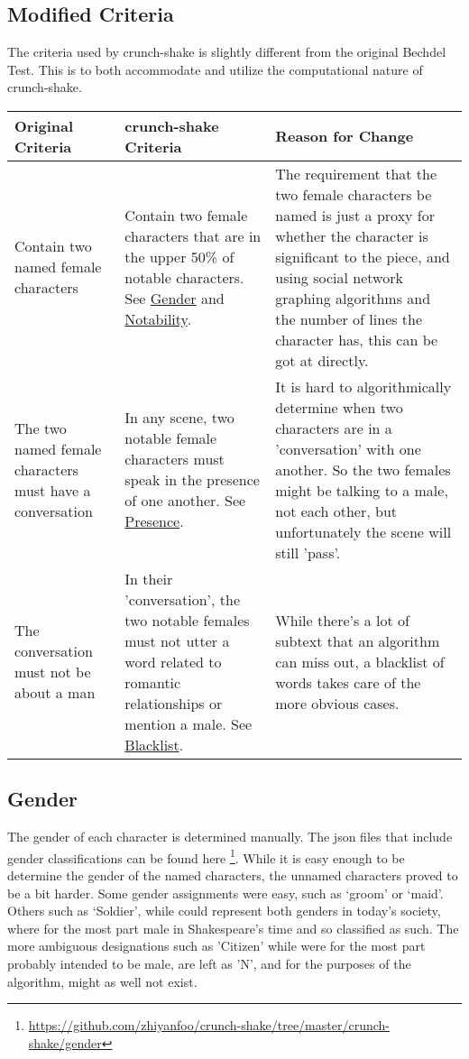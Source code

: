 \documentclass[12pt]{article}
\begin{document}
\subsection{Modified Criteria}
\label{sub:crunch_shake_s_new_criteria}
The criteria used by crunch-shake is slightly different from the original
Bechdel Test. This is to both accommodate and utilize the computational nature
of crunch-shake. 
\begin{center}
    \begin{tabularx}{\textwidth}{ | X | X | X |}
    \hline
    Original Criteria & crunch-shake Criteria & Reason for Change \\ \hline
        Contain two named female characters & Contain two female characters
        that are in the upper 50\% of notable characters. See
        \hyperref[sub:gender]{Gender} and
        \hyperref[sub:notability]{Notability}.
        & The requirement that the two female characters be named is just a
        proxy for whether the character is significant to the piece, and using
        social network graphing algorithms and the number of lines the
        character has, this can be got at directly.
        \\ \hline
    The two named female characters must have a conversation & In any scene,
        two notable female characters must speak in the presence of one
        another.
        See \hyperref[sub:presence]{Presence}.
        & It is hard to algorithmically determine when two characters are in a
        'conversation' with one another. So the two females might be talking to
        a male, not each other, but unfortunately the scene will still
        'pass'. \\ \hline
    The conversation must not be about a man & In their 'conversation', the two
        notable females must not utter a word related to romantic relationships
        or mention a male. See \hyperref[sub:blacklist]{Blacklist}. & While
        there's a lot of subtext that an algorithm can miss out, a blacklist of
        words takes care of the more obvious
        cases. \\
    \hline
    \end{tabularx}
\end{center}

\subsection{Gender}
\label{sub:gender}

The gender of each character is determined manually. The json files that
include gender classifications can be found
here
\footnote{\url{https://github.com/zhiyanfoo/crunch-shake/tree/master/crunch-shake/gender}}.
While it is easy enough to be determine the gender of the named characters, the
unnamed characters proved to be a bit harder. Some gender assignments were
easy, such as `groom' or `maid'. Others such as `Soldier', while could
represent both genders in today's society, where for the most part male in
Shakespeare's time and so classified as such. The more ambiguous designations
such as 'Citizen' while were for the most part probably intended to be male,
are left as 'N', and for the purposes of the algorithm, might as well not
exist.
\end{document}
